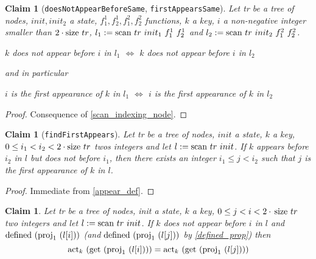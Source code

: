 \documentclass{article}
\newtheorem{claim}[lemma]{Claim}
\newcommand{\textfun}[1]{\textup{#1}}
\newcommand{\textcode}[1]{\texttt{#1}}
\newcommand{\longscan}[4]{\textfun{scan}\ #1\ #2\ #3 \ #4}
\newcommand{\scan}[2]{\textfun{scan}\ #1\ #2}
\newcommand{\defined}[1]{\textfun{defined}\ #1}
\newcommand{\get}[1]{\textfun{get}\ #1}
\newcommand{\size}[1]{\textfun{size}\ #1}
\newcommand{\fst}[1]{\textfun{proj}_1\ #1}
\newcommand{\actkey}[2]{\textfun{act}_{#1}\ #2}
\begin{document}
\begin{claim}[\textcode{doesNotAppearBeforeSame}, \textcode{firstAppearsSame}]
    \label{appear_same}
    Let tr be a tree of nodes, $init, init_2$ a state, $f^1_1, f^1_2, f^2_1, f^2_2$ functions, $k$ a key, $i$ a non-negative integer smaller than $2 \cdot \size{tr}$,
     $l_1 := \longscan{tr}{init_1}{f^1_1}{f^1_2}$ and $l_2 := \longscan{tr}{init_2}{f^2_1}{f^2_2}$. 
     \begin{center}
        $k$ does not appear before $i$ in $l_1$ $\iff$ $k$ does not appear before $i$ in $l_2$
     \end{center}  
     and in particular
     \begin{center}
        $i$ is the first appearance of $k$ in $l_1$ $\iff$ $i$ is the first appearance of $k$ in $l_2$
     \end{center}  
\end{claim}

\begin{proof}
    Consequence of \cref{scan_indexing_node}.
\end{proof}

\begin{claim}[\textcode{findFirstAppears}]
    \label{find_first_appear}
    Let tr be a tree of nodes, $init$ a state, $k$ a key, $0 \leq i_1 < i_2 < 2\cdot \size{tr}$ twos integers and
    let $l := \scan{tr}{init}$. If $k$ appears before $i_2$ in $l$ but does not before $i_1$, then there exists an integer 
    $i_1 \leq j < i_2$ such that $j$ is the first appearance of $k$ in $l$.
\end{claim}

\begin{proof}
    Immediate from \cref{appear_def}.
\end{proof}

\begin{claim}
    \label{actkey_not_appear}
    Let tr be a tree of nodes, init a state, $k$ a key, $0 \leq j < i < 2\cdot\, \size{tr}$ two integers and let $l := \scan{tr}{init}$. 
    If $k$ does not appear before $i$ in $l$ and $\defined{(\fst{(l[i])})}$ (and  $\defined{(\fst{(l[j])})}$ by \cref{defined_prop}) then 
    \[\actkey{k}{(\get{(\fst{(l[i])})})} = \actkey{k}{(\get{(\fst{(l[j])})})}\]
\end{claim}
\end{document}
